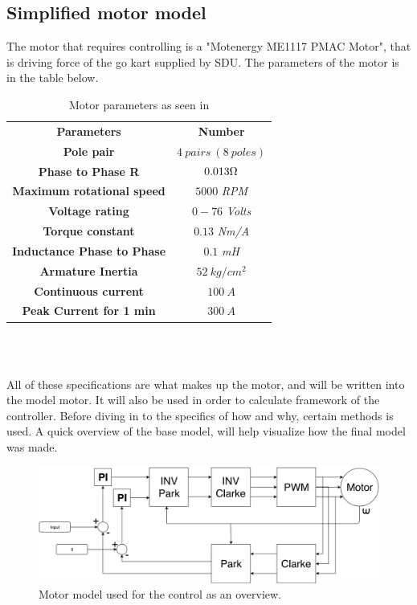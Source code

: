 \subsection{Simplified motor model}
The motor that requires controlling is a "Motenergy ME1117 PMAC Motor", that is driving force of the go kart supplied by SDU. The parameters of the motor is in the table below.

\begin{table} [H]
\centering
\begin{tabular}{|c|c|} \cline{1-2}
\textbf{Parameters} & \textbf{Number} \\ \cline{1-2}
\textbf{Pole pair} & $4\ pairs\ (8\ poles)$ \\ \cline{1-2}
\textbf{Phase to Phase R} & $0.013\ohm$ \\ \cline{1-2}
\textbf{Maximum rotational speed} & $5000$ \textit{RPM} \\ \cline{1-2}
\textbf{Voltage rating} & $0-76$ \textit{Volts} \\ \cline{1-2}
\textbf{Torque constant} & $0.13$ \textit{Nm/A} \\ \cline{1-2}
\textbf{Inductance Phase to Phase} & $0.1$ \textit{mH} \\ \cline{1-2}
\textbf{Armature Inertia} & $52\ kg/cm^2$ \\ \cline{1-2}
\textbf{Continuous current} & $100\ A$ \\ \cline{1-2}
\textbf{Peak Current for 1 min} & $300\ A$ \\ \cline{1-2}  
\end{tabular} \\
\caption{Motor parameters as seen in \cite{Motor_Parameters}}
\label{Motor_parameters_list}
\end{table} \\

All of these specifications are what makes up the motor, and will be written into the model motor. It will also be used in order to calculate framework of the controller. Before diving in to the specifics of how and why, certain methods is used. A quick overview of the base model, will help visualize how the final model was made.\\

\begin{figure} [H]
    \centering
    \includegraphics[scale=0.4]{pictures/control/udklip.PNG}
    \caption{Motor model used for the control as an overview.}
    \label{fig:Motor_model}
\end{figure} \\

